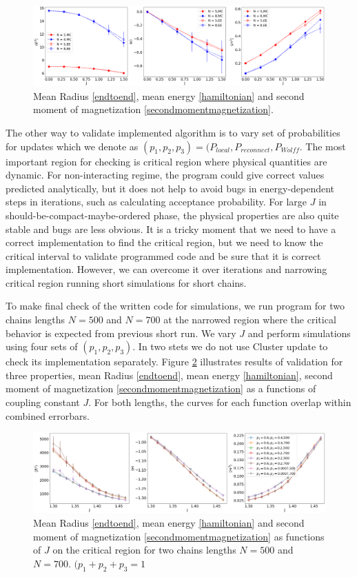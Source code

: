  \begin{figure} 
	\centering
	\includegraphics[scale=0.26]{Images/EE.png}
	\caption{  Mean Radius \eqref{endtoend}, mean energy \eqref{hamiltonian} and   second moment of magnetization \eqref{secondmomentmagnetization}.   }
	\label{fig:ee}
\end{figure}

The other way to validate implemented algorithm is to vary set of probabilities for updates which we denote as $(p_1,p_2,p_3)= (P_{local},P_{reconnect},P_{Wolff}$. The most important region for checking is critical region where physical quantities are dynamic. For non-interacting regime, the program could give correct values predicted analytically, but it does not help to avoid bugs in energy-dependent steps in iterations, such as calculating acceptance probability. For large $J$ in should-be-compact-maybe-ordered phase, the physical properties are also quite stable and bugs are less obvious.  It is a tricky moment that we need to have a correct implementation to find the critical region, but we need to know the critical interval to validate programmed code and be sure that it is correct implementation. However, we can overcome it over iterations and narrowing critical region running short simulations for short chains. 

To make final check of the written code for simulations, we run program for two chains lengths $N=500$ and $N=700$ at the narrowed region where the critical behavior is expected from previous short run. We vary $J$ and perform simulations using four sets of $(p_1,p_2,p_3)$. In two stets we do not use Cluster update to check its implementation separately. Figure \ref{fig:MCdiffP} illustrates results of validation for three properties, mean Radius \eqref{endtoend}, mean energy \eqref{hamiltonian}, second moment of magnetization \eqref{secondmomentmagnetization} as a functions of coupling constant $J$. For both lengths, the curves for each function overlap within combined errorbars. 


 \begin{figure} 
	\centering
	\includegraphics[scale=0.26]{Images/tests_2D.png}
	\caption{ Mean Radius \eqref{endtoend}, mean energy \eqref{hamiltonian} and   second moment of magnetization \eqref{secondmomentmagnetization} as functions of $J$ on the critical region for two chains lengths $N=500$ and $N=700$. $(p_1 + p_2 + p_3 = 1 $  }
	\label{fig:MCdiffP}
\end{figure}



